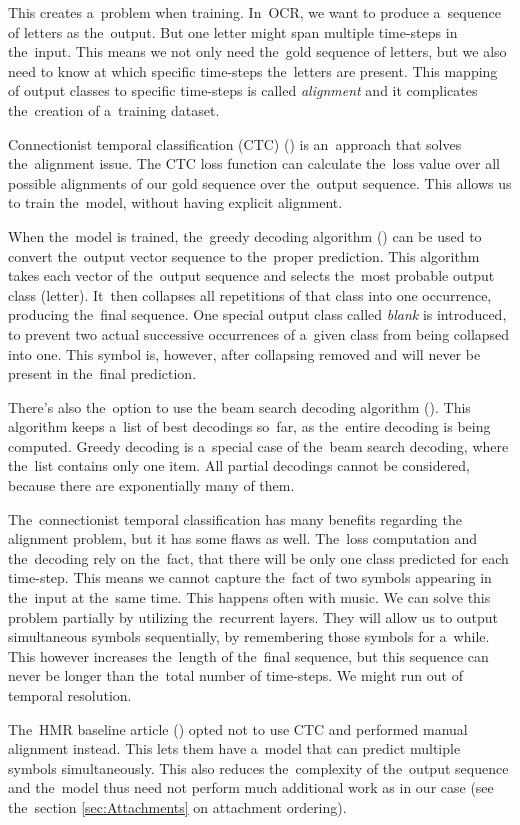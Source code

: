 This creates a~problem when training. In~OCR, we want to produce a~sequence of letters as the~output. But one letter might span multiple time-steps in the~input. This means we not only need the~gold sequence of letters, but we also need to know at which specific time-steps the~letters are present. This mapping of output classes to specific time-steps is called \emph{alignment} and it complicates the~creation of a~training dataset.

Connectionist temporal classification (CTC) (\cite{CTC}) is an~approach that solves the~alignment issue. The CTC loss function can calculate the~loss value over all possible alignments of our gold sequence over the~output sequence. This allows us to train the~model, without having explicit alignment.

When the~model is trained, the~greedy decoding algorithm (\cite{CTC}) can be used to convert the~output vector sequence to the~proper prediction. This algorithm takes each vector of the~output sequence and selects the~most probable output class (letter). It~then collapses all repetitions of that class into one occurrence, producing the~final sequence. One special output class called \emph{blank} is introduced, to prevent two actual successive occurrences of a~given class from being collapsed into one. This symbol is, however, after collapsing removed and will never be present in the~final prediction.

There's also the~option to use the beam search decoding algorithm (\cite{CtcBeamSearch}). This algorithm keeps a~list of best decodings so~far, as the~entire decoding is being computed. Greedy decoding is a~special case of the~beam search decoding, where the~list contains only one item. All partial decodings cannot be considered, because there are exponentially many of them.

The~connectionist temporal classification has many benefits regarding the alignment problem, but it has some flaws as well. The~loss computation and the~decoding rely on the~fact, that there will be only one class predicted for each time-step. This means we cannot capture the~fact of two symbols appearing in the~input at the~same time. This happens often with music. We can solve this problem partially by utilizing the~recurrent layers. They will allow us to output simultaneous symbols sequentially, by remembering those symbols for a~while. This however increases the~length of the~final sequence, but this sequence can never be longer than the~total number of time-steps. We might run out of temporal resolution.

The~HMR baseline article (\cite{HmrBaseline}) opted not to use CTC and performed manual alignment instead. This lets them have a~model that can predict multiple symbols simultaneously. This also reduces the~complexity of the~output sequence and the~model thus need not perform much additional work as in our case (see the~section \ref{sec:Attachments} on attachment ordering).
